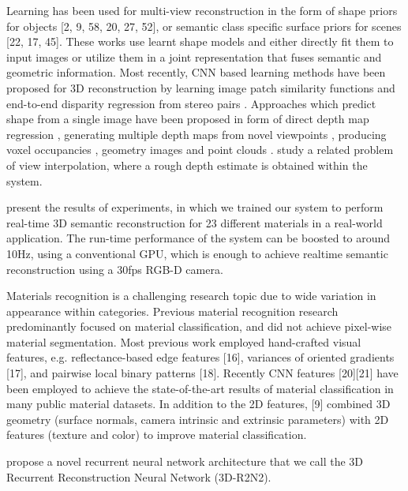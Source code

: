 \documentclass{article}
\begin{document}
Learning has been used for multi-view reconstruction in the form of shape priors for objects [2, 9, 58, 20, 27, 52], or semantic class specific surface priors for scenes [22, 17, 45]. These works use learnt shape models and either directly fit them to input images or utilize them in a joint representation that fuses semantic and geometric information. Most recently, CNN based learning methods have been proposed for 3D reconstruction by learning image patch similarity functions \cite {zbontar2016stereo} \cite {han2015matchnet} \cite {hartmann2017learned} and end-to-end disparity regression from stereo pairs \cite {mayer2016large} \cite {kendall2017end} . Approaches which predict shape from a single image have been proposed in form of direct depth map regression \cite {saxena2007depth} \cite {ladicky2014pulling} \cite {eigen2014depth}, generating multiple depth maps from novel viewpoints \cite {tatarchenko2016multi}, producing voxel occupancies \cite {choy20163d} \cite {girdhar2016learning}, geometry images \cite {sinha2016deep} and point clouds \cite {fan2017point}. \cite {flynn2016deepstereo} study a related problem of view interpolation, where a rough depth estimate is obtained within the system.\par

\cite {zhao2017fully} present the results of experiments, in which we trained our system to perform real-time 3D semantic reconstruction for 23 different materials in a real-world application. The run-time performance of the system can be boosted to around 10Hz, using a conventional GPU, which is enough to achieve realtime semantic reconstruction using a 30fps RGB-D camera.

Materials recognition is a challenging research topic due to wide variation in appearance within categories. Previous material recognition research predominantly focused on material classification, and did not achieve pixel-wise material segmentation. Most previous work employed hand-crafted visual features, e.g. reflectance-based edge features [16], variances of
oriented gradients [17], and pairwise local binary patterns [18]. Recently CNN features \cite { schwartz2013visual} [20][21] have been employed to achieve the state-of-the-art results of material classification in many public material datasets. In addition to the 2D features, [9] combined 3D geometry (surface normals, camera intrinsic and extrinsic parameters) with 2D features (texture and color) to improve material classification.

\cite {choy20163d}  propose a novel recurrent neural network architecture that we call the 3D Recurrent Reconstruction Neural Network (3D-R2N2).




% 

\end{document}
